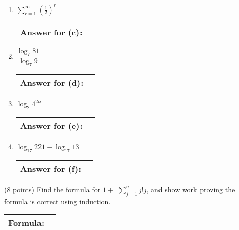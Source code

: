 \documentclass[11pt]{article}
\begin{document}
\begin{problems}
\begin{enumerate}
\item $\displaystyle\sum_{r=1}^\infty(\frac{1}{2})^r$
\vspace{1.25in}
\begin{table}[!h] \flushright \renewcommand{\arraystretch}{2}  \begin{tabular}{|l|c| } \hline
Answer for (c): & \hspace{2in} \\
\hline \end{tabular} \end{table}

\item $\dfrac{\log_7 81}{\log_7 9}$ 
\vspace{1in}
\begin{table}[!h] \flushright \renewcommand{\arraystretch}{2}  \begin{tabular}{|l|c| } \hline
Answer for (d): & \hspace{2in} \\
\hline \end{tabular} \end{table}

\item $\log_2 4^{2n}$  
\vspace{1in}
\begin{table}[!h] \flushright \renewcommand{\arraystretch}{2}  \begin{tabular}{|l|c| } \hline
Answer for (e): & \hspace{2in} \\
\hline \end{tabular} \end{table}

\item $\log_{17} 221 - \log_{17} 13$ 
\vspace{1in}
\begin{table}[!h] \flushright \renewcommand{\arraystretch}{2}  \begin{tabular}{|l|c| } \hline
Answer for (f): & \hspace{2in} \\
\hline \end{tabular} \end{table}
\end{enumerate}

\newpage
 \item (8 points) Find the formula for $1+$ $\displaystyle\sum_{j=1}^n j!j $,
and show work proving the formula is correct using induction.
\begin{table}[!h] \flushright \renewcommand{\arraystretch}{2}  \begin{tabular}{|l|c| } \hline
Formula: & \hspace{2in} \\
\hline \end{tabular} \end{table}
\vspace{1.75in}


\end{problems}
\end{document}
